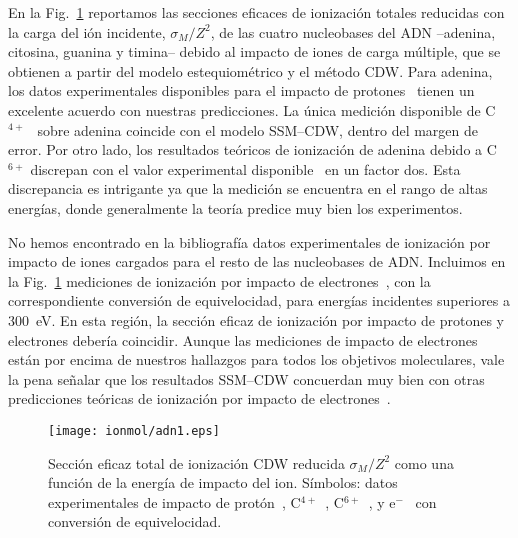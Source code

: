 En la Fig.~\ref{fig:crossDNA_1} reportamos las secciones eficaces de 
ionización totales reducidas con la carga del ión incidente, 
$\sigma_M/Z^2$, de las cuatro nucleobases del ADN --adenina, citosina, 
guanina y timina-- debido al impacto de iones de carga múltiple, que se 
obtienen a partir del modelo estequiométrico y el método CDW. Para 
adenina, los datos experimentales disponibles para el impacto de 
protones~\cite{Iriki:11} tienen un excelente acuerdo con nuestras 
predicciones. La única medición disponible de C$^{4+}$~\cite{Sens:20} 
sobre adenina coincide con el modelo SSM--CDW, dentro del margen de 
error. Por otro lado, los resultados teóricos de ionización de adenina
debido a C$^{6+}$ discrepan con el valor experimental 
disponible~\cite{Bhattacharjee:19} en un factor dos. Esta discrepancia es 
intrigante ya que la medición se encuentra en el rango de altas energías, 
donde generalmente la teoría predice muy bien los experimentos.

No hemos encontrado en la bibliografía datos experimentales de ionización 
por impacto de iones cargados para el resto de las nucleobases de ADN.
Incluimos en la Fig.~\ref{fig:crossDNA_1} mediciones de ionización por 
impacto de electrones~\cite{Rahman:16}, con la correspondiente 
conversión de equivelocidad, para energías incidentes superiores a 
300~eV. En esta región, la sección eficaz de ionización por impacto de 
protones y electrones debería coincidir. Aunque las mediciones de impacto 
de electrones están por encima de nuestros hallazgos para todos los 
objetivos moleculares, vale la pena señalar que los resultados SSM--CDW
concuerdan muy bien con otras predicciones teóricas de ionización por 
impacto de electrones~\cite{mozejko2003,tan2018}.

\begin{figure}
\centering
\texttt{[image: ionmol/adn1.eps]}
\caption[Sección eficaz total de ionización reducida por $Z$ (Parte I).]
{Sección eficaz total de ionización CDW reducida $\sigma_{M}/Z^2$ como 
una función de la energía de impacto del ion. Símbolos: datos 
experimentales de impacto de protón~\cite{Iriki:11}, 
C$^{4+}$~\cite{Sens:20}, C$^{6+}$~\cite{Bhattacharjee:19}, y 
e$^-$~\cite{Rahman:16} con conversión de equivelocidad.}
\label{fig:crossDNA_1}
\end{figure} 

